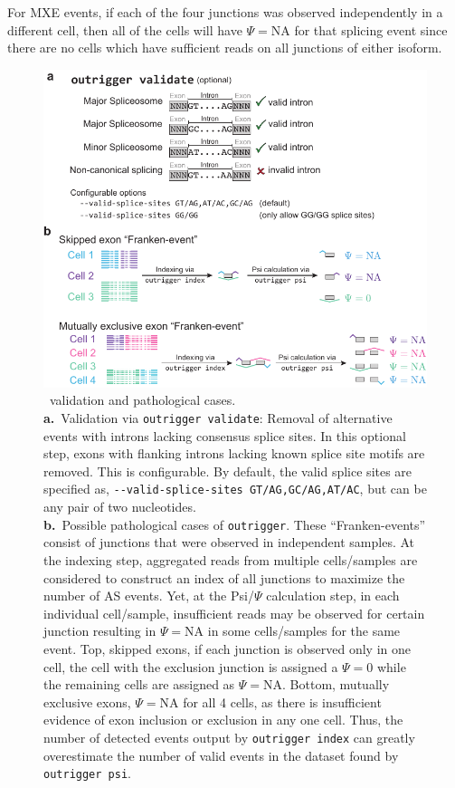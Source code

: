For MXE events, if each of the four junctions was observed independently in a different cell, then all of the cells will have $\Psi = \text{NA}$ for that splicing event since there are no cells which have sufficient reads on all junctions of either isoform.

\begin{figure}
  \centering
  \includegraphics[width=5.8in]{figures/outrigger_validate}
  \caption[\outrigger\, validation and pathological cases.]{
  \outrigger\, validation and pathological cases.\\
\textbf{a.}~Validation via \texttt{outrigger validate}: Removal of alternative events with introns lacking consensus splice sites. In this optional step, exons with flanking introns lacking known splice site motifs are removed. This is configurable. By default, the valid splice sites are specified as, \texttt{-{}-valid-splice-sites GT/AG,GC/AG,AT/AC}, but can be any pair of two nucleotides.\\
\textbf{b.}~Possible pathological cases of \texttt{outrigger}. These ``Franken-events'' consist of junctions that were observed in independent samples. At the indexing step, aggregated reads from multiple cells/samples are considered to construct an index of all junctions to maximize the number of AS events. Yet, at the Psi/$\Psi$ calculation step, in each individual cell/sample, insufficient reads may be observed for certain junction resulting in $\Psi=\text{NA}$ in some cells/samples for the same event. Top, skipped exons, if each junction is observed only in one cell, the cell with the exclusion junction is assigned a $\Psi=0$ while the remaining cells are assigned as $\Psi=\text{NA}$. Bottom, mutually exclusive exons, $\Psi=\text{NA}$ for all 4 cells, as there is insufficient evidence of exon inclusion or exclusion in any one cell. Thus, the number of detected events output by \texttt{outrigger index} can greatly overestimate the number of valid events in the dataset found by \texttt{outrigger psi}.
}
\label{fig:outrigger_validate_frankenevents}
\end{figure}



